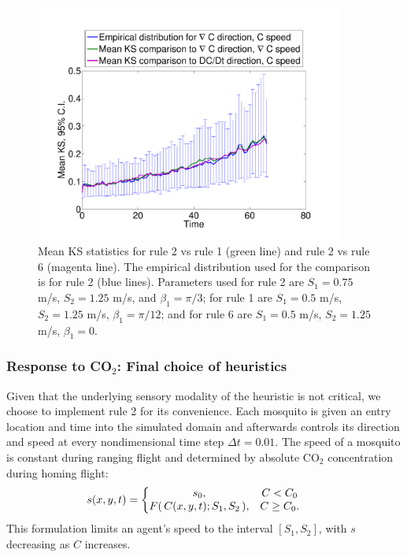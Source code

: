 \documentclass[12pt]{article}
\begin{document}
	\begin{figure}[hbp]
		\begin{center}
			\includegraphics[width=4.0in]{figures/GoodComparisonsRS02PS027_RS01PS13_RS06PS12.pdf} 
		\end{center}
		\caption{Mean KS statistics for rule 2 vs rule 1 (green line) and rule 2 vs rule 6 (magenta line). The empirical distribution used for the comparison is for rule 2 (blue lines). Parameters used for rule 2 are $S_1 =  0.75$ m/s, $ S_2 = 1.25$ m/s, and $ \beta_1 = \pi/3$; for rule 1 are $S_1 =  0.5$ m/s, $ S_2 = 1.25$ m/s, $ \beta_1 = \pi/12$; and for rule 6 are $S_1 =  0.5$ m/s, $ S_2 = 1.25$ m/s, $ \beta_1 = 0$.}
		\label{fig:goodmatches}
		\end{figure}
	
	
	
		
	\subsubsection{Response to CO$_2$: Final choice of heuristics}
	
	Given that the underlying sensory modality of the heuristic is not critical, we choose to implement rule 2 for its convenience. Each mosquito is given an entry location and time into the simulated domain and afterwards controls its direction and speed at every nondimensional time step $\Delta t = 0.01$. 
	The speed of a mosquito is constant during ranging flight and determined by absolute CO$_2$ concentration during homing flight:
	\[
	s(x,y,t) =   \left\{\begin{matrix} s_0, & C < C_0 \\ F(\,C(x,y,t);S_1,S_2\,), & C \geq C_0 . \end{matrix} \right.
	\hskip20pt
	\]
	This formulation limits an agent's speed to the interval $[S_1,S_2]$, with $s$ decreasing as $C$ increases. 
	
\end{document}
